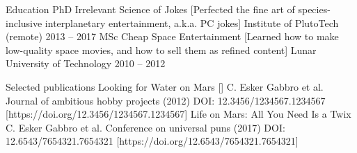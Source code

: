 \documentclass[
]{llresume}
\begin{document}
\makeheader

\begin{mainpane}
    \begin{mainsection}
        {Education} %
                \entryJob
                {PhD Irrelevant Science of Jokes} %
                [Perfected the fine art of species-inclusive interplanetary entertainment, a.k.a. PC jokes] %
                {Institute of PlutoTech (remote)} %
                {2013 -- 2017} %
            \entryJob
            {MSc Cheap Space Entertainment}
            [Learned how to make low-quality space movies, and how to sell them
                as refined content]
            {Lunar University of Technology}
            {2010 -- 2012}
    \end{mainsection}

    \begin{mainsection}
        {Selected publications} %
                \entryPub
                {Looking for Water on Mars} %
                []%
                {C. Esker Gabbro et al.} %
                {Journal of ambitious hobby projects (2012)} %
                {DOI: 12.3456/1234567.1234567} %
                [https://doi.org/12.3456/1234567.1234567] %
            \entryPub
            {Life on Mars: All You Need Is a Twix}
            {C. Esker Gabbro et al.}
            {Conference on universal puns (2017)}
            {DOI: 12.6543/7654321.7654321}
            [https://doi.org/12.6543/7654321.7654321]
    \end{mainsection}


\end{mainpane}
\end{document}

